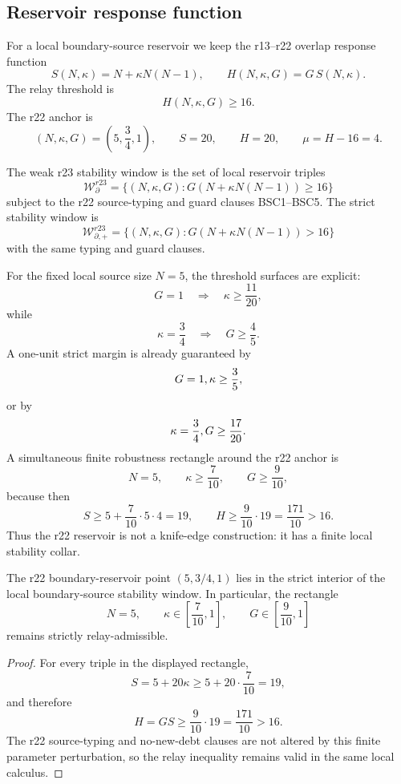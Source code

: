\subsection{Reservoir response function}
\label{subsec:v470-r23-reservoir-response-function}

For a local boundary-source reservoir we keep the r13--r22 overlap response
function
\[
S(N,\kappa)=N+\kappa N(N-1),
\qquad
H(N,\kappa,G)=G\,S(N,\kappa).
\]
The relay threshold is
\[
H(N,\kappa,G)\geq 16.
\]
The r22 anchor is
\[
(N,\kappa,G)=\left(5,\frac34,1\right),
\qquad
S=20,
\qquad
H=20,
\qquad
\mu=H-16=4.
\]

\begin{definition}
\label{def:v470-r23-boundary-source-stability-window}
The weak r23 stability window is the set of local reservoir triples
\[
\mathcal W_{\partial}^{r23}
=
\{(N,\kappa,G):G(N+\kappa N(N-1))\geq 16\}
\]
subject to the r22 source-typing and guard clauses BSC1--BSC5.  The strict
stability window is
\[
\mathcal W_{\partial,+}^{r23}
=
\{(N,\kappa,G):G(N+\kappa N(N-1))>16\}
\]
with the same typing and guard clauses.
\end{definition}

For the fixed local source size \(N=5\), the threshold surfaces are explicit:
\[
G=1\quad\Longrightarrow\quad
\kappa\geq\frac{11}{20},
\]
while
\[
\kappa=\frac34\quad\Longrightarrow\quad
G\geq\frac45.
\]
A one-unit strict margin is already guaranteed by
\[
G=1,\\ \kappa\geq\frac35,
\]
or by
\[
\kappa=\frac34,\\ G\geq\frac{17}{20}.
\]
A simultaneous finite robustness rectangle around the r22 anchor is
\[
\boxed{
N=5,
\qquad
\kappa\geq\frac7{10},
\qquad
G\geq\frac9{10},
}
\]
because then
\[
S\geq 5+\frac7{10}\cdot 5\cdot4=19,
\qquad
H\geq\frac9{10}\cdot 19=\frac{171}{10}>16.
\]
Thus the r22 reservoir is not a knife-edge construction: it has a finite local
stability collar.

\begin{lemma}
\label{lem:v470-r23-local-stability-collar}
The r22 boundary-reservoir point
\((5,3/4,1)\) lies in the strict interior of the local boundary-source stability
window.  In particular, the rectangle
\[
N=5,
\qquad
\kappa\in\left[\frac7{10},1\right],
\qquad
G\in\left[\frac9{10},1\right]
\]
remains strictly relay-admissible.
\end{lemma}

\begin{proof}
For every triple in the displayed rectangle,
\[
S=5+20\kappa\geq 5+20\cdot\frac7{10}=19,
\]
and therefore
\[
H=GS\geq \frac9{10}\cdot19=\frac{171}{10}>16.
\]
The r22 source-typing and no-new-debt clauses are not altered by this finite
parameter perturbation, so the relay inequality remains valid in the same local
calculus.
\end{proof}

